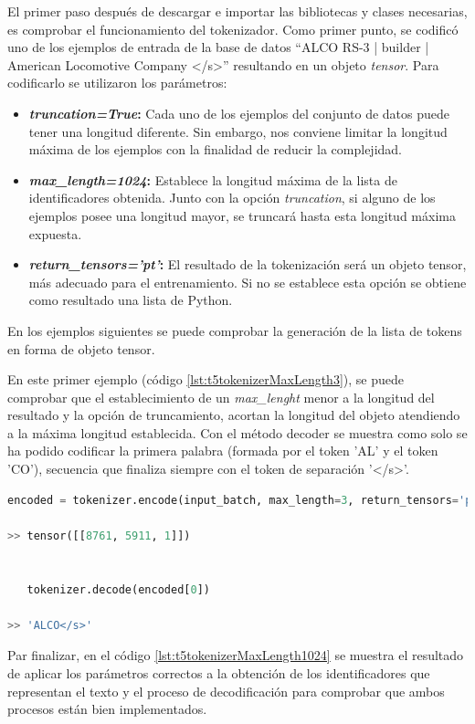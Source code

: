 El primer paso después de descargar e importar las bibliotecas y clases necesarias, es comprobar el funcionamiento del tokenizador. Como primer punto, se codificó uno de los ejemplos de entrada de la base de datos ``ALCO RS-3 | builder | American Locomotive Company </s>'' resultando en un objeto \textit{tensor}. Para codificarlo se utilizaron los parámetros:
\begin{itemize}
    \item \textbf{\textit{truncation=True}:} Cada  uno de los ejemplos del conjunto de datos puede tener una longitud diferente. Sin embargo, nos conviene limitar la longitud máxima de los ejemplos con la finalidad de reducir la complejidad.
    \item \textbf{\textit{max\_length=1024}:} Establece la longitud máxima de la lista de identificadores obtenida. Junto con la opción \textit{truncation}, si alguno de los ejemplos posee una longitud mayor, se truncará hasta esta longitud máxima expuesta. 
    \item \textbf{\textit{return\_tensors='pt'}:} El resultado de la tokenización será un objeto tensor, más adecuado para el entrenamiento. Si no se establece esta opción se obtiene como resultado una lista de Python.
\end{itemize} 

En los ejemplos siguientes se puede comprobar la generación de la lista de tokens en forma de objeto tensor.

En este primer ejemplo (código \ref{lst:t5tokenizerMaxLength3}), se puede comprobar que el establecimiento de un \textit{max\_lenght} menor a la longitud del resultado y la opción de truncamiento, acortan la longitud del objeto atendiendo a la máxima longitud establecida. Con el método decoder se muestra como solo se ha podido codificar la primera palabra (formada por el token 'AL' y el token 'CO'), secuencia que finaliza siempre con el token de separación '</s>'.


\begin{lstlisting}[language=Python, caption=Tokenizador con max\_length igual a 3, label={lst:t5tokenizerMaxLength3}]
   encoded = tokenizer.encode(input_batch, max_length=3, return_tensors='pt', truncation=True)
    
>> tensor([[8761, 5911, 1]])
    
   
   tokenizer.decode(encoded[0])
   
>> 'ALCO</s>'
\end{lstlisting} 


Par finalizar, en el código \ref{lst:t5tokenizerMaxLength1024} se muestra el resultado de aplicar los parámetros correctos a la obtención de los identificadores que representan el texto y el proceso de decodificación para comprobar que ambos procesos están bien implementados.

